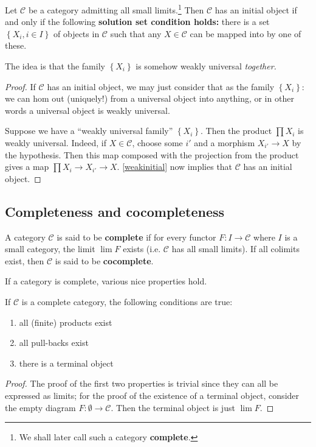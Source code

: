 \begin{theorem}[Freyd] \label{initialobjectthm}
Let $\mathcal{C}$ be a category admitting all small limits.\footnote{We shall
later call such a category \textbf{complete}.} Then $\mathcal{C}$ has an initial
object if and only if the following \textbf{solution set condition holds:}
there is a set $\left\{X_i, i \in I\right\}$ of objects in $\mathcal{C}$ such
that any $X \in \mathcal{C}$ can be mapped into by one of these.
\end{theorem}

The idea is that the family $\left\{X_i\right\}$ is somehow weakly universal
\emph{together.}
\begin{proof}
If $\mathcal{C}$ has an initial object, we may just consider that as the
family $\left\{X_i\right\}$: we can hom out (uniquely!) from a universal
object into anything, or in other words a universal object is weakly universal.

Suppose we have a ``weakly universal family'' $\left\{X_i\right\}$. Then the
product $\prod X_i$ is weakly universal. Indeed, if $X \in \mathcal{C}$,
choose some $i'$ and a morphism $X_{i'} \to X$ by the hypothesis. Then this map
composed with the projection from the product gives a map  $\prod X_i \to
X_{i'} \to X$.
\cref{weakinitial} now implies that $\mathcal{C}$ has an initial object.
\end{proof}

\subsection{Completeness and cocompleteness}
\begin{definition}\label{completecat} A category $\mathcal{C}$ is said to be \textbf{complete} if for every
functor $F:I\rightarrow \mathcal{C}$ where $I$ is a small category, the limit
$\lim F$ exists (i.e. $\mathcal{C}$ has all small limits). If all colimits exist, then $\mathcal{C}$ is said to be
\textbf{cocomplete}.
\end{definition}

If a category is complete, various nice properties hold.
\begin{proposition} If $\mathcal{C}$ is a complete category, the following
conditions are true:
\begin{enumerate}
\item{all (finite) products exist}
\item{all pull-backs exist}
\item{there is a terminal object}
\end{enumerate}
\end{proposition}
\begin{proof} The proof of the first two properties is trivial since they can
all be expressed as limits; for the proof of the existence of a terminal
object, consider the empty diagram $F:\emptyset \rightarrow \mathcal{C}$. Then
the
terminal object is just $\lim F$.
\end{proof}


